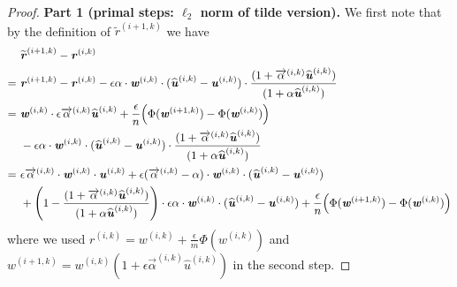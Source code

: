 \documentclass[11pt]{article}
\let\originalleft\left
\let\originalright\right
\renewcommand{\left}{\mathopen{}\mathclose\bgroup\originalleft}
\renewcommand{\right}{\aftergroup\egroup\originalright}
\newcommand\rr{\boldsymbol{\mathit{r}}}
\newcommand\uu{\boldsymbol{\mathit{u}}}
\newcommand\ww{\boldsymbol{\mathit{w}}}
\newcommand{\wh}{\widehat}
\newcommand{\wt}{\widetilde}
\begin{document}
\begin{proof}

{\bf Part 1 (primal steps: $\ell_2$ norm of tilde version).} 
We first note that by the definition of $\wt{\rr}^{(i+1,k)}$ we have
\begin{align*}
&~ \wt{\rr}^{(i+1,k)} - \rr^{(i,k)} \\
= &~ \rr^{(i+1,k)} - \rr^{(i,k)} - \epsilon \alpha \cdot \ww^{(i,k)} \cdot (\wh{\uu}^{(i,k)} - \uu^{(i,k)}) \cdot \frac{(1 + \overrightarrow{\alpha}^{(i,k)} \wh{\uu}^{(i,k)})}{(1 + \alpha \wh{\uu}^{(i,k)})} \\
= &~ \ww^{(i,k)} \cdot \epsilon \overrightarrow{\alpha}^{(i,k)} \wh{\uu}^{(i,k)} + \frac{\epsilon}{n} \Big(\Phi(\ww^{(i+1,k)}) - \Phi(\ww^{(i,k)})\Big) \\
&~ - \epsilon \alpha \cdot \ww^{(i,k)} \cdot (\wh{\uu}^{(i,k)} - \uu^{(i,k)}) \cdot \frac{(1 + \overrightarrow{\alpha}^{(i,k)} \wh{\uu}^{(i,k)})}{(1 + \alpha \wh{\uu}^{(i,k)})} \\
= &~ \epsilon \overrightarrow{\alpha}^{(i,k)} \cdot \ww^{(i,k)} \cdot \uu^{(i,k)} + \epsilon (\overrightarrow{\alpha}^{(i,k)} - \alpha) \cdot \ww^{(i,k)} \cdot (\wh{\uu}^{(i,k)} - \uu^{(i,k)}) \\
&~ + \left(1 - \frac{(1 + \overrightarrow{\alpha}^{(i,k)} \wh{\uu}^{(i,k)})}{(1 + \alpha \wh{\uu}^{(i,k)})} \right) \cdot \epsilon \alpha \cdot \ww^{(i,k)} \cdot (\wh{\uu}^{(i,k)} - \uu^{(i,k)}) + \frac{\epsilon}{n} \Big(\Phi(\ww^{(i+1,k)}) - \Phi(\ww^{(i,k)})\Big)
\end{align*}
where we used $\rr^{(i,k)} = \ww^{(i,k)} + \frac{\epsilon}{m} \Phi(\ww^{(i,k)})$ and $\ww^{(i+1,k)} = \ww^{(i,k)} (1 + \epsilon \overrightarrow{\alpha}^{(i,k)} \wh{\uu}^{(i,k)})$ in the second step.


\end{proof}
\end{document}
